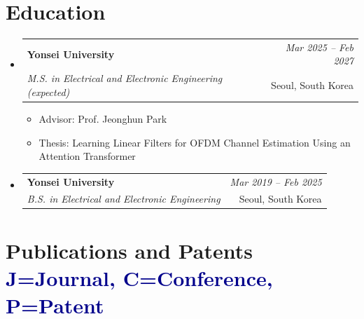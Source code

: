 \documentclass[a4paper,11pt]{article}
\makeatletter
\newcommand{\resumeSubheading}[4]{
    \vspace{0.5mm}\item
    \begin{tabular*}{0.98\textwidth}[t]{l@{\extracolsep{\fill}}r}
        \textbf{#1} & \textit{\footnotesize{#4}} \\
        \textit{\footnotesize{#3}} & \footnotesize{#2} \\
    \end{tabular*}
    \vspace{-1.2mm}
}
\newcommand{\resumeSubHeadingListStart}{
    \begin{itemize}[leftmargin=*,labelsep=1mm]
}
\newcommand{\resumeItemListStart}{
    \begin{itemize}[leftmargin=*,labelsep=1mm,itemsep=1.4mm]
}
\newcommand{\resumeSubHeadingListEnd}{
    \end{itemize}\vspace{2mm}
}
\newcommand{\resumeItemListEnd}{
    \end{itemize}\vspace{-0.5mm}
}
\makeatother
\begin{document}
\section{\textbf{Education}}
\vspace{-0.4mm}

\resumeSubHeadingListStart

\resumeSubheading
{Yonsei University}
{Seoul, South Korea}
{M.S. in Electrical and Electronic Engineering (expected)}
{Mar 2025 -- Feb 2027}

\resumeItemListStart
\item Advisor: Prof. Jeonghun Park
\item Thesis: Learning Linear Filters for OFDM Channel Estimation Using an Attention Transformer
\resumeItemListEnd

\resumeSubheading
{Yonsei University}
{Seoul, South Korea}
{B.S. in Electrical and Electronic Engineering}
{Mar 2019 -- Feb 2025}



\resumeSubHeadingListEnd
\vspace{-4mm}


\section{
    \textbf{Publications and Patents}
    \hfill
    \textcolor{darkblue}{
        \scriptsize J=Journal, C=Conference, P=Patent
    }
}

\vspace{0.2mm}
\end{document}
